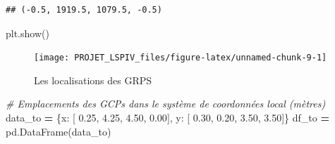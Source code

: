\documentclass[
]{article}
\newenvironment{Shaded}{\begin{snugshade}}{\end{snugshade}}
\newcommand{\CommentTok}[1]{\textcolor[rgb]{0.56,0.35,0.01}{\textit{#1}}}
\newcommand{\FloatTok}[1]{\textcolor[rgb]{0.00,0.00,0.81}{#1}}
\newcommand{\NormalTok}[1]{#1}
\newcommand{\OperatorTok}[1]{\textcolor[rgb]{0.81,0.36,0.00}{\textbf{#1}}}
\newcommand{\StringTok}[1]{\textcolor[rgb]{0.31,0.60,0.02}{#1}}
\begin{document}
\begin{verbatim}
## (-0.5, 1919.5, 1079.5, -0.5)
\end{verbatim}

\begin{Shaded}
\begin{Highlighting}[]
\NormalTok{plt.show()}
\end{Highlighting}
\end{Shaded}

\begin{figure}[H]
\texttt{[image: PROJET\_LSPIV\_files/figure-latex/unnamed-chunk-9-1]} \caption{Les localisations des GRPS}\label{fig:unnamed-chunk-9}
\end{figure}

\begin{Shaded}
\begin{Highlighting}[]
\CommentTok{\# Emplacements des GCPs dans le système de coordonnées local (mètres)}
\NormalTok{data\_to }\OperatorTok{=}\NormalTok{ \{}\StringTok{\textquotesingle{}x\textquotesingle{}}\NormalTok{: [ }\FloatTok{0.25}\NormalTok{, }\FloatTok{4.25}\NormalTok{, }\FloatTok{4.50}\NormalTok{, }\FloatTok{0.00}\NormalTok{],}
           \StringTok{\textquotesingle{}y\textquotesingle{}}\NormalTok{: [ }\FloatTok{0.30}\NormalTok{, }\FloatTok{0.20}\NormalTok{, }\FloatTok{3.50}\NormalTok{, }\FloatTok{3.50}\NormalTok{]\}}
\NormalTok{df\_to }\OperatorTok{=}\NormalTok{ pd.DataFrame(data\_to)}
\end{Highlighting}
\end{Shaded}
\end{document}
